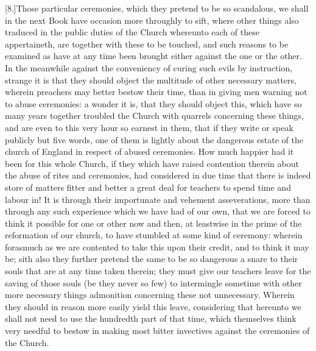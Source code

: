 [8.]Those particular ceremonies, which they pretend to be so scandalous, we shall in the next Book have occasion more throughly to sift, where other things also traduced in the public duties of the Church whereunto each of these appertaineth, are together with these to be touched, and such reasons to be examined as have at any time been brought either against the one or the other. In the meanwhile against the conveniency of curing such evils by instruction, strange it is that they should object the multitude of other necessary matters, wherein preachers may better bestow their time, than in giving men warning not to abuse ceremonies: a wonder it is, that they should object this, which have so many years together troubled the Church with quarrels concerning these things, and are even to this very hour so earnest in them, that if they write or speak publicly but five words, one of them is lightly about the dangerous estate of the church of England in respect of abused ceremonies. How much happier had it been for this whole Church, if they which have raised contention therein about the abuse of rites and ceremonies, had considered in due time that there is indeed store of matters fitter and better a great deal for teachers to spend time and labour in! It is through their importunate and vehement asseverations, more than through any such experience which we have had of our own, that we are forced to think it possible for one or other now and then, at leastwise in the prime of the reformation of our church, to have stumbled at some kind of ceremony: wherein forasmuch as we are contented to take this upon their credit, and to think it may be; sith also they further pretend the same to be so dangerous a snare to their souls that are at any time  taken therein; they must give our teachers leave for the saving of those souls (be they never so few) to intermingle sometime with other more necessary things admonition concerning these not unnecessary. Wherein they should in reason more easily yield this leave, considering that hereunto we shall not need to use the hundredth part of that time, which themselves think very needful to bestow in making most bitter invectives against the ceremonies of the Church.

